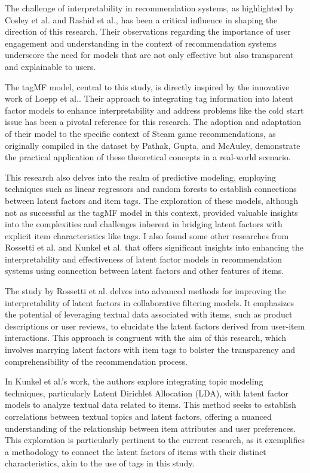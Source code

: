 \documentclass[sigplan,screen]{acmart}
\begin{document}
The challenge of interpretability in recommendation systems, as highlighted by Cosley et al.\cite{Cosley07} and Rashid et al.\cite{Rashid02}, has been a critical influence in shaping the direction of this research. Their observations regarding the importance of user engagement and understanding in the context of recommendation systems underscore the need for models that are not only effective but also transparent and explainable to users.

The tagMF model, central to this study, is directly inspired by the innovative work of Loepp et al.\cite{LOEPP201921}. Their approach to integrating tag information into latent factor models to enhance interpretability and address problems like the cold start issue has been a pivotal reference for this research. The adoption and adaptation of their model to the specific context of Steam game recommendations, as originally compiled in the dataset by Pathak, Gupta, and McAuley\cite{Pathak17}, demonstrate the practical application of these theoretical concepts in a real-world scenario.

This research also delves into the realm of predictive modeling, employing techniques such as linear regressors and random forests to establish connections between latent factors and item tags. The exploration of these models, although not as successful as the tagMF model in this context, provided valuable insights into the complexities and challenges inherent in bridging latent factors with explicit item characteristics like tags. I also found some other researches from Rossetti et al.\cite{Rossetti13} and Kunkel et al.\cite{kunkel18} that offers significant insights into enhancing the interpretability and effectiveness of latent factor models in recommendation systems using connection between latent factors and other features of items.

The study by Rossetti et al. \cite{Rossetti13} delves into advanced methods for improving the interpretability of latent factors in collaborative filtering models. It emphasizes the potential of leveraging textual data associated with items, such as product descriptions or user reviews, to elucidate the latent factors derived from user-item interactions. This approach is congruent with the aim of this research, which involves marrying latent factors with item tags to bolster the transparency and comprehensibility of the recommendation process.

In Kunkel et al.'s work\cite{kunkel18}, the authors explore integrating topic modeling techniques, particularly Latent Dirichlet Allocation (LDA), with latent factor models to analyze textual data related to items. This method seeks to establish correlations between textual topics and latent factors, offering a nuanced understanding of the relationship between item attributes and user preferences. This exploration is particularly pertinent to the current research, as it exemplifies a methodology to connect the latent factors of items with their distinct characteristics, akin to the use of tags in this study.
\end{document}
